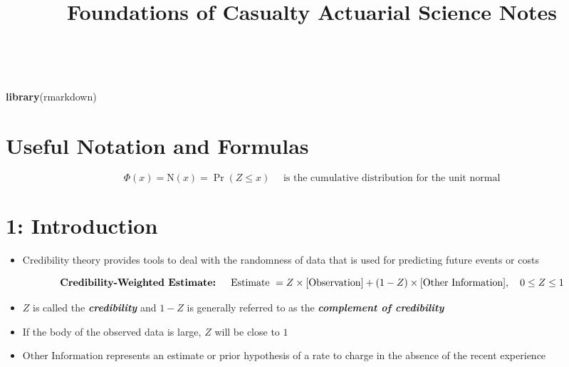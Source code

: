 \documentclass[
]{article}
\title{Foundations of Casualty Actuarial Science Notes}
\author{}
\date{\vspace{-2.5em}}
\newenvironment{Shaded}{\begin{snugshade}}{\end{snugshade}}
\newcommand{\KeywordTok}[1]{\textcolor[rgb]{0.13,0.29,0.53}{\textbf{#1}}}
\newcommand{\NormalTok}[1]{#1}
\providecommand{\tightlist}{%
  \setlength{\itemsep}{0pt}\setlength{\parskip}{0pt}}
\begin{document}
\maketitle

\(\newcommand{\vect}[1]{\boldsymbol{#1}}\)
\(\newcommand\given[1][]{\:#1\vert\:}\)

\begin{Shaded}
\begin{Highlighting}[]
\KeywordTok{library}\NormalTok{(rmarkdown)}
\end{Highlighting}
\end{Shaded}

\hypertarget{useful-notation-and-formulas}{%
\section{Useful Notation and
Formulas}\label{useful-notation-and-formulas}}

\begin{red}

\[
  \Phi(x)= \text{N}(x)  =\Pr(Z \le x) \quad \text{ is the cumulative distribution for the unit normal}
\]

\end{red}

\hypertarget{introduction}{%
\section{1: Introduction}\label{introduction}}

\begin{itemize}
\tightlist
\item
  Credibility theory provides tools to deal with the randomness of data
  that is used for predicting future events or costs
\end{itemize}

\begin{purple}

\[
  \textbf{Credibility-Weighted Estimate: } \\ \quad \text{Estimate } = Z \times [\text{Observation}] + (1-Z) \times [\text{Other Information}], \quad 0 \leq Z \leq 1 \\
\]

\begin{itemize}
\item
  \(Z\) is called the \textbf{\emph{credibility}} and \(1-Z\) is
  generally referred to as the \textbf{\emph{complement of credibility}}
\item
  If the body of the observed data is large, \(Z\) will be close to
  \(1\)
\item
  \(\text{Other Information}\) represents an estimate or prior
  hypothesis of a rate to charge in the absence of the recent experience
\end{itemize}

\end{purple}
\end{document}
